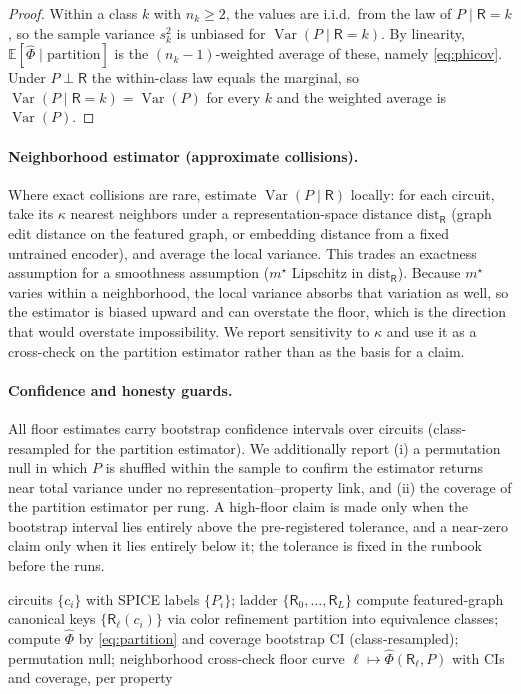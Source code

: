 \documentclass[10pt]{article}
\newcommand{\E}{\mathbb{E}}
\newcommand{\Var}{\operatorname{Var}}
\newcommand{\R}{\mathsf{R}}
\begin{document}
\begin{proof}
Within a class $k$ with $n_k\ge2$, the values are i.i.d.\ from the law of $P\mid\R=k$, so the sample variance $s_k^2$ is unbiased for $\Var(P\mid\R=k)$. By linearity, $\E[\widehat\Phi\mid\text{partition}]$ is the $(n_k-1)$-weighted average of these, namely \cref{eq:phicov}. Under $P\perp\R$ the within-class law equals the marginal, so $\Var(P\mid\R=k)=\Var(P)$ for every $k$ and the weighted average is $\Var(P)$.
\end{proof}

\paragraph{Neighborhood estimator (approximate collisions).}
Where exact collisions are rare, estimate $\Var(P\mid\R)$ locally: for each circuit, take its $\kappa$ nearest neighbors under a representation-space distance $\mathrm{dist}_\R$ (graph edit distance on the featured graph, or embedding distance from a fixed untrained encoder), and average the local variance. This trades an exactness assumption for a smoothness assumption ($m^\star$ Lipschitz in $\mathrm{dist}_\R$). Because $m^\star$ varies within a neighborhood, the local variance absorbs that variation as well, so the estimator is biased upward and can overstate the floor, which is the direction that would overstate impossibility. We report sensitivity to $\kappa$ and use it as a cross-check on the partition estimator rather than as the basis for a claim.

\paragraph{Confidence and honesty guards.}
All floor estimates carry bootstrap confidence intervals over circuits (class-resampled for the partition estimator). We additionally report (i) a permutation null in which $P$ is shuffled within the sample to confirm the estimator returns near total variance under no representation--property link, and (ii) the coverage of the partition estimator per rung. A high-floor claim is made only when the bootstrap interval lies entirely above the pre-registered tolerance, and a near-zero claim only when it lies entirely below it; the tolerance is fixed in the runbook before the runs.

\begin{algorithm}[t]
\caption{Per-property sufficiency floor along the representation ladder}
\label{alg:floor}
\begin{algorithmic}[1]
\Require circuits $\{c_i\}$ with SPICE labels $\{P_i\}$; ladder $\{\R_0,\dots,\R_L\}$
\For{each rung $\R_\ell$ and each property $P$}
  \State compute featured-graph canonical keys $\{\R_\ell(c_i)\}$ via color refinement
  \State partition into equivalence classes; compute $\widehat{\Phi}$ by \cref{eq:partition} and coverage
  \State bootstrap CI (class-resampled); permutation null; neighborhood cross-check
\EndFor
\State \Return floor curve $\ell\mapsto\widehat{\Phi}(\R_\ell,P)$ with CIs and coverage, per property
\end{algorithmic}
\end{algorithm}
\end{document}
